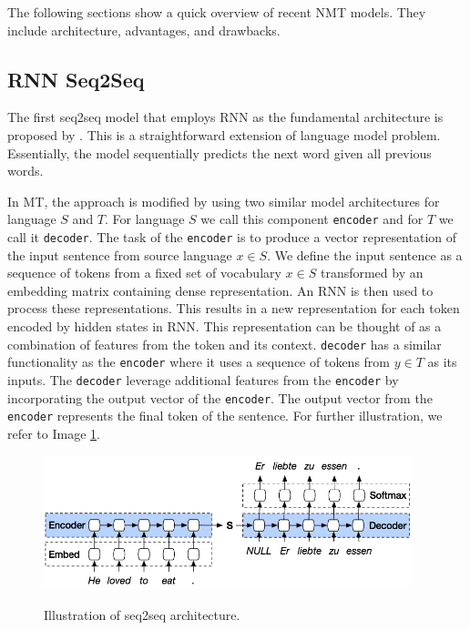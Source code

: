 The following sections show a quick overview of recent NMT models. They include architecture, advantages, and drawbacks.

\subsection{RNN Seq2Seq}
The first seq2seq model that employs RNN as the fundamental architecture is proposed by \cite{sutskever2014sequence}. This is a straightforward extension of language model problem. Essentially, the model sequentially predicts the next word given all previous words.

In MT, the approach is modified by using two similar model architectures for language $S$ and $T$. For language $S$ we call this component \texttt{encoder} and for $T$ we call it \texttt{decoder}.
The task of the \texttt{encoder} is to produce a vector representation of the input sentence from source language $x \in S$. We define the input sentence as a sequence of tokens from a fixed set of vocabulary $x \in S$ transformed by an embedding matrix containing dense representation. An RNN is then used to process these representations. This results in a new representation for each token encoded by hidden states in RNN. This representation can be thought of as a combination of features from the token and its context.
\texttt{decoder} has a similar functionality as the \texttt{encoder} where it uses a sequence of tokens from $y \in T$ as its inputs. The \texttt{decoder} leverage additional features from the \texttt{encoder} by incorporating the output vector of the \texttt{encoder}. The output vector from the \texttt{encoder} represents the final token of the sentence. For further illustration, we refer to Image \ref{img:rnnseq2seq}.

\begin{figure}[h]
    {\includegraphics[width=0.95\textwidth]{img/rnnseq2seq.png}}
    \centering
    \caption{Illustration of seq2seq architecture\protect\footnotemark[1].}
    \label{img:rnnseq2seq}
\end{figure}

